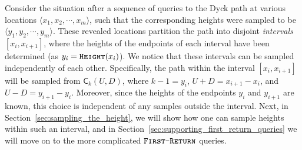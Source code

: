 Consider the situation after a sequence of  queries to the Dyck path at various locations $\langle x_1, x_2,\cdots, x_m \rangle$,
such that the corresponding heights were sampled to be $ \langle y_1, y_2,\cdots, y_m \rangle$.
These revealed locations partition the path into disjoint \emph{intervals} $[x_i,x_{i+1}]$,
where the heights of the endpoints of each interval have been determined (as $y_i = \texttt{\textsc{Height}}(x_i)$).
We notice that these intervals can be sampled independently of each other.
Specifically, the path within the interval $[x_i, x_{i+1}]$ will be sampled from $\mathsf C_k(U,D)$,
where $k - 1 = y_i$, $U + D = x_{i+1} - x_i$, and $U-D = y_{i+1} - y_i$.
Moreover, since the heights of the endpoints $y_i$ and $y_{i+1}$ are known, this choice is independent of any samples outside the interval.
Next, in Section~\ref{sec:sampling_the_height}, we will show how one can sample heights within such an interval,
and in Section~\ref{sec:supporting_first_return_queries} we will move on to the more complicated $\texttt{\textsc{First-Return}}$ queries.




